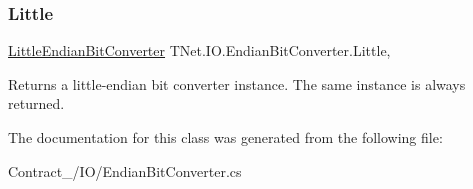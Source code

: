 \subsubsection{\texorpdfstring{Little}{Little}}
{\footnotesize\ttfamily \mbox{\hyperlink{class_t_net_1_1_i_o_1_1_little_endian_bit_converter}{Little\+Endian\+Bit\+Converter}} T\+Net.\+I\+O.\+Endian\+Bit\+Converter.\+Little\hspace{0.3cm}{\ttfamily [static]}, {\ttfamily [get]}}



Returns a little-\/endian bit converter instance. The same instance is always returned. 



The documentation for this class was generated from the following file\+:\begin{DoxyCompactItemize}
\item 
Contract\+\_\+/\+I\+O/Endian\+Bit\+Converter.\+cs\end{DoxyCompactItemize}
